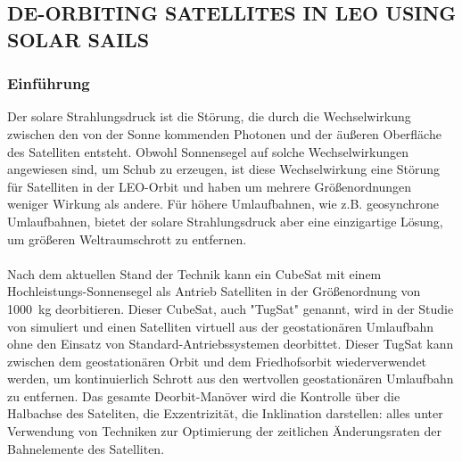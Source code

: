 \documentclass{article}
\begin{document}
\subsection{DE-ORBITING SATELLITES IN LEO USING SOLAR SAILS}
\subsubsection{Einführung}
Der solare Strahlungsdruck ist die Störung, die durch die Wechselwirkung zwischen den von der Sonne kommenden Photonen und der äußeren Oberfläche des Satelliten entsteht. Obwohl Sonnensegel auf solche Wechselwirkungen angewiesen sind, um Schub zu erzeugen, ist diese Wechselwirkung eine Störung für Satelliten in der LEO-Orbit und haben um mehrere Größenordnungen weniger Wirkung als andere. Für höhere Umlaufbahnen, wie z.B. geosynchrone Umlaufbahnen, bietet der solare Strahlungsdruck aber eine einzigartige Lösung, um größeren Weltraumschrott zu entfernen. \\\\
Nach dem aktuellen Stand der Technik kann ein CubeSat mit einem Hochleistungs-Sonnensegel als Antrieb Satelliten in der Größenordnung von \SI{1000}{\kilogram} deorbitieren. Dieser CubeSat, auch "TugSat" genannt, wird in der Studie von \citet{Kelly:2018} simuliert und einen Satelliten virtuell aus der geostationären Umlaufbahn ohne den Einsatz von Standard-Antriebssystemen deorbittet. Dieser TugSat kann zwischen dem geostationären Orbit und dem Friedhofsorbit wiederverwendet werden, um kontinuierlich Schrott aus den wertvollen geostationären Umlaufbahn zu entfernen. Das gesamte Deorbit-Manöver wird die Kontrolle über die Halbachse des Sateliten, die Exzentrizität, die Inklination darstellen: alles unter Verwendung von Techniken zur Optimierung der zeitlichen Änderungsraten der Bahnelemente des Satelliten. 
\end{document}
